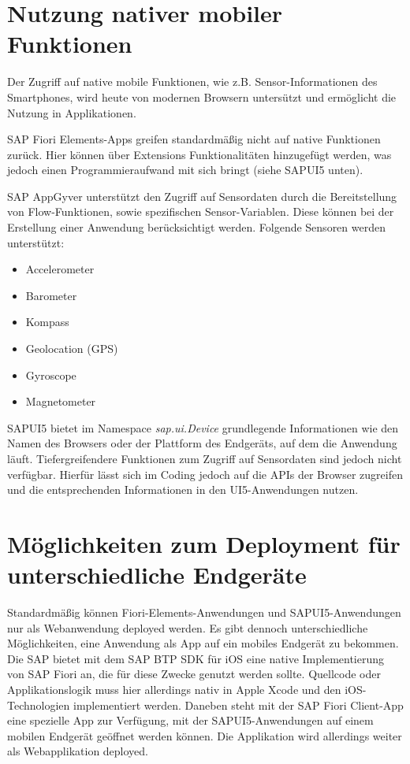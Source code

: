 \section{Nutzung nativer mobiler Funktionen}

Der Zugriff auf native mobile Funktionen, wie z.B. Sensor-Informationen des Smartphones, wird heute von modernen Browsern untersützt und ermöglicht die Nutzung in Applikationen.

SAP Fiori Elements-Apps greifen standardmäßig nicht auf native Funktionen zurück. Hier können über Extensions Funktionalitäten hinzugefügt werden, was jedoch einen Programmieraufwand mit sich bringt (siehe SAPUI5 unten).

SAP AppGyver unterstützt den Zugriff auf Sensordaten durch die Bereitstellung von Flow-Funktionen, sowie spezifischen Sensor-Variablen. Diese können bei der Erstellung einer Anwendung berücksichtigt werden. Folgende Sensoren werden unterstützt:

\begin{itemize}[noitemsep]
\item Accelerometer 
\item Barometer
\item Kompass
\item Geolocation (GPS) 
\item Gyroscope
\item Magnetometer
\end{itemize}

SAPUI5 bietet im Namespace \textit{sap.ui.Device} grundlegende Informationen wie den Namen des Browsers oder der Plattform des Endgeräts, auf dem die Anwendung läuft. Tiefergreifendere Funktionen zum Zugriff auf Sensordaten sind  jedoch nicht verfügbar. Hierfür lässt sich im Coding jedoch auf die APIs der Browser zugreifen und die entsprechenden Informationen in den UI5-Anwendungen nutzen.

\section{Möglichkeiten zum Deployment für unterschiedliche Endgeräte}

Standardmäßig können Fiori-Elements-Anwendungen und SAPUI5-Anwendungen nur als Webanwendung deployed werden. Es gibt dennoch unterschiedliche Möglichkeiten, eine Anwendung als App auf ein mobiles Endgerät zu bekommen. Die SAP bietet mit dem SAP BTP SDK für iOS eine native Implementierung von SAP Fiori an, die für diese Zwecke genutzt werden sollte. Quellcode oder Applikationslogik muss hier allerdings nativ in Apple Xcode und den iOS-Technologien implementiert werden. Daneben steht mit der SAP Fiori Client-App eine spezielle App zur Verfügung, mit der SAPUI5-Anwendungen auf einem mobilen Endgerät geöffnet werden können. Die Applikation wird allerdings weiter als Webapplikation deployed.

